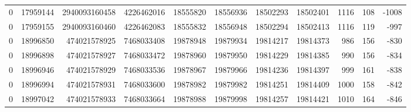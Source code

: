 \begin{tabular}{rrrrrrrrrrr}
0 & 17959144 & 2940093160458 & 4226462016 & 18555820 & 18556936 & 18502293 & 18502401 & 1116 & 108 & -1008 \\
0 & 17959155 & 2940093160460 & 4226462083 & 18555832 & 18556948 & 18502294 & 18502413 & 1116 & 119 & -997 \\
0 & 18996850 & 474021578925 & 7468033408 & 19878948 & 19879934 & 19814217 & 19814373 & 986 & 156 & -830 \\
0 & 18996898 & 474021578927 & 7468033472 & 19878960 & 19879950 & 19814229 & 19814385 & 990 & 156 & -834 \\
0 & 18996946 & 474021578929 & 7468033536 & 19878967 & 19879966 & 19814236 & 19814397 & 999 & 161 & -838 \\
0 & 18996994 & 474021578931 & 7468033600 & 19878982 & 19879982 & 19814251 & 19814409 & 1000 & 158 & -842 \\
0 & 18997042 & 474021578933 & 7468033664 & 19878988 & 19879998 & 19814257 & 19814421 & 1010 & 164 & -846 \\
\bottomrule
\end{tabular}
